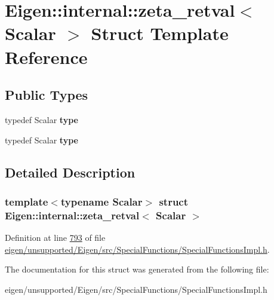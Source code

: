 \hypertarget{struct_eigen_1_1internal_1_1zeta__retval}{}\section{Eigen\+:\+:internal\+:\+:zeta\+\_\+retval$<$ Scalar $>$ Struct Template Reference}
\label{struct_eigen_1_1internal_1_1zeta__retval}
\subsection*{Public Types}
\begin{DoxyCompactItemize}
\item 
\mbox{\label{struct_eigen_1_1internal_1_1zeta__retval_a8ce22358ba6aeef9739a374ad2cef881}} 
typedef Scalar {\bfseries type}
\item 
\mbox{\label{struct_eigen_1_1internal_1_1zeta__retval_a8ce22358ba6aeef9739a374ad2cef881}} 
typedef Scalar {\bfseries type}
\end{DoxyCompactItemize}


\subsection{Detailed Description}
\subsubsection*{template$<$typename Scalar$>$\newline
struct Eigen\+::internal\+::zeta\+\_\+retval$<$ Scalar $>$}



Definition at line \hyperlink{eigen_2unsupported_2_eigen_2src_2_special_functions_2_special_functions_impl_8h_source_l00793}{793} of file \hyperlink{eigen_2unsupported_2_eigen_2src_2_special_functions_2_special_functions_impl_8h_source}{eigen/unsupported/\+Eigen/src/\+Special\+Functions/\+Special\+Functions\+Impl.\+h}.



The documentation for this struct was generated from the following file\+:\begin{DoxyCompactItemize}
\item 
eigen/unsupported/\+Eigen/src/\+Special\+Functions/\+Special\+Functions\+Impl.\+h\end{DoxyCompactItemize}
